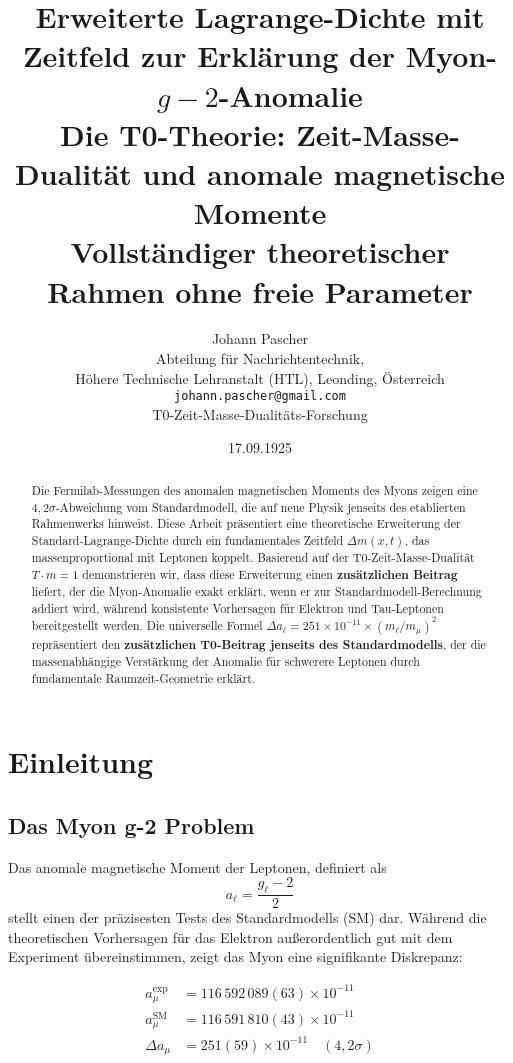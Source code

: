 \documentclass[12pt,a4paper]{article}
\title{\textbf{Erweiterte Lagrange-Dichte mit Zeitfeld zur Erklärung der Myon-\(g-2\)-Anomalie}\\[0.5cm]
	\large Die T0-Theorie: Zeit-Masse-Dualität und anomale magnetische Momente\\[0.3cm]
	\normalsize Vollständiger theoretischer Rahmen ohne freie Parameter}
\author{Johann Pascher\\
	\small Abteilung für Nachrichtentechnik,\\
	\small Höhere Technische Lehranstalt (HTL), Leonding, Österreich\\
	\small \texttt{johann.pascher@gmail.com}\\
	\small T0-Zeit-Masse-Dualitäts-Forschung}
\date{17.09.1925}
\theoremstyle{definition}
\begin{document}
	\maketitle
	\thispagestyle{fancy}
	
	\begin{abstract}
		Die Fermilab-Messungen des anomalen magnetischen Moments des Myons zeigen eine $4,2\sigma$-Abweichung vom Standardmodell, die auf neue Physik jenseits des etablierten Rahmenwerks hinweist. Diese Arbeit präsentiert eine theoretische Erweiterung der Standard-Lagrange-Dichte durch ein fundamentales Zeitfeld $\Delta m(x,t)$, das massenproportional mit Leptonen koppelt. Basierend auf der T0-Zeit-Masse-Dualität $T \cdot m = 1$ demonstrieren wir, dass diese Erweiterung einen \textbf{zusätzlichen Beitrag} liefert, der die Myon-Anomalie exakt erklärt, wenn er zur Standardmodell-Berechnung addiert wird, während konsistente Vorhersagen für Elektron und Tau-Leptonen bereitgestellt werden. Die universelle Formel $\Delta a_\ell = 251 \times 10^{-11} \times (m_\ell/m_\mu)^2$ repräsentiert den \textbf{zusätzlichen T0-Beitrag jenseits des Standardmodells}, der die massenabhängige Verstärkung der Anomalie für schwerere Leptonen durch fundamentale Raumzeit-Geometrie erklärt.
	\end{abstract}
	
	\section{Einleitung}
	
	\subsection{Das Myon g-2 Problem}
	
	Das anomale magnetische Moment der Leptonen, definiert als
	\begin{equation}
		a_\ell = \frac{g_\ell - 2}{2}
	\end{equation}
	stellt einen der präzisesten Tests des Standardmodells (SM) dar. Während die theoretischen Vorhersagen für das Elektron außerordentlich gut mit dem Experiment übereinstimmen, zeigt das Myon eine signifikante Diskrepanz\cite{muong2_fermilab_2021}:
	
	\begin{align}
		a_\mu^{\text{exp}} &= 116\,592\,089(63) \times 10^{-11}\\
		a_\mu^{\text{SM}} &= 116\,591\,810(43) \times 10^{-11}\\
		\Delta a_\mu &= 251(59) \times 10^{-11} \quad (4,2\sigma)
	\end{align}
	
\end{document}
